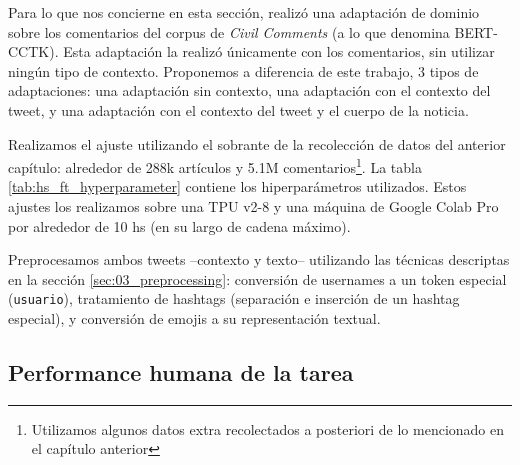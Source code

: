 Para lo que nos concierne en esta sección, \citet{pavlopoulos2020toxicity} realizó una adaptación de dominio sobre los comentarios del corpus de \emph{Civil Comments} (a lo que denomina BERT-CCTK). Esta adaptación la realizó únicamente con los comentarios, sin utilizar ningún tipo de contexto. Proponemos a diferencia de este trabajo, 3 tipos de adaptaciones: una adaptación sin contexto, una adaptación con el contexto del tweet, y una adaptación con el contexto del tweet y el cuerpo de la noticia.

Realizamos el ajuste utilizando el sobrante de la recolección de datos del anterior capítulo: alrededor de 288k artículos y 5.1M comentarios\footnote{Utilizamos algunos datos extra recolectados a posteriori de lo mencionado en el capítulo anterior}. La tabla \ref{tab:hs_ft_hyperparameter} contiene los hiperparámetros utilizados. Estos ajustes los realizamos sobre una TPU v2-8 y una máquina de Google Colab Pro por alrededor de 10 hs (en su largo de cadena máximo).



Preprocesamos ambos tweets --contexto y texto-- utilizando las técnicas descriptas en la sección \ref{sec:03_preprocessing}: conversión de usernames a un token especial (\verb|usuario|), tratamiento de hashtags (separación e inserción de un hashtag especial), y conversión de emojis a su representación textual.


\subsection{Performance humana de la tarea}


